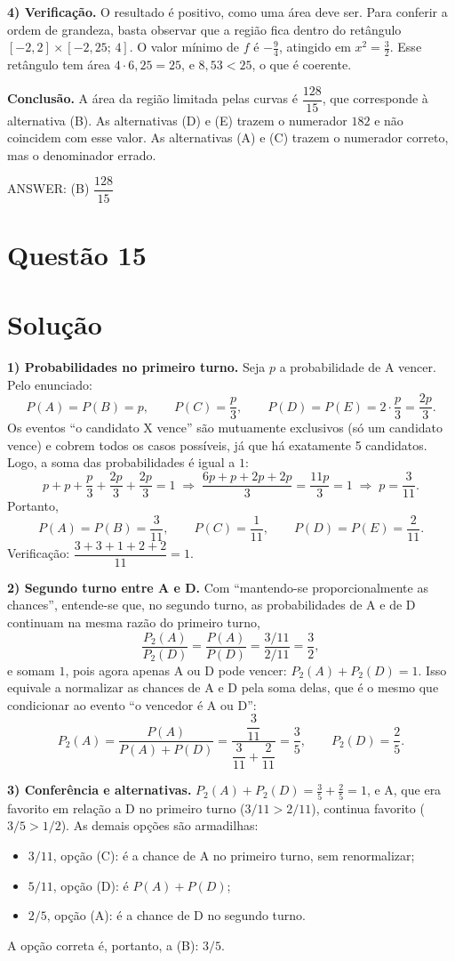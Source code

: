 \documentclass{article}%
\begin{document}
\textbf{4) Verificação.} O resultado é positivo, como uma área deve ser. Para conferir a ordem de grandeza, basta observar que a região fica dentro do retângulo $[-2,2]\times[-2{,}25;\,4]$. O valor mínimo de $f$ é $-\frac{9}{4}$, atingido em $x^2=\frac{3}{2}$. Esse retângulo tem área $4\cdot 6{,}25=25$, e $8{,}53<25$, o que é coerente.

\textbf{Conclusão.} A área da região limitada pelas curvas é $\dfrac{128}{15}$, que corresponde à alternativa (B). As alternativas (D) e (E) trazem o numerador $182$ e não coincidem com esse valor. As alternativas (A) e (C) trazem o numerador correto, mas o denominador errado.

ANSWER: (B) $\dfrac{128}{15}$%
\newpage%
\section*{Questão 15}

\section*{Solução}

\textbf{1) Probabilidades no primeiro turno.} Seja $p$ a probabilidade de A vencer. Pelo enunciado:
\[
P(A)=P(B)=p,\qquad P(C)=\frac{p}{3},\qquad P(D)=P(E)=2\cdot\frac{p}{3}=\frac{2p}{3}.
\]
Os eventos ``o candidato X vence'' são mutuamente exclusivos (só um candidato vence) e cobrem todos os casos possíveis, já que há exatamente 5 candidatos. Logo, a soma das probabilidades é igual a $1$:
\[
p+p+\frac{p}{3}+\frac{2p}{3}+\frac{2p}{3}=1
\;\Longrightarrow\;
\frac{6p+p+2p+2p}{3}=\frac{11p}{3}=1
\;\Longrightarrow\;
p=\frac{3}{11}.
\]
Portanto,
\[
P(A)=P(B)=\frac{3}{11},\qquad P(C)=\frac{1}{11},\qquad P(D)=P(E)=\frac{2}{11}.
\]
Verificação: $\dfrac{3+3+1+2+2}{11}=1$.

\textbf{2) Segundo turno entre A e D.} Com ``mantendo-se proporcionalmente as chances'', entende-se que, no segundo turno, as probabilidades de A e de D continuam na mesma razão do primeiro turno,
\[
\frac{P_2(A)}{P_2(D)}=\frac{P(A)}{P(D)}=\frac{3/11}{2/11}=\frac{3}{2},
\]
e somam $1$, pois agora apenas A ou D pode vencer: $P_2(A)+P_2(D)=1$. Isso equivale a normalizar as chances de A e D pela soma delas, que é o mesmo que condicionar ao evento ``o vencedor é A ou D'':
\[
P_2(A)=\frac{P(A)}{P(A)+P(D)}=\frac{\dfrac{3}{11}}{\dfrac{3}{11}+\dfrac{2}{11}}=\frac{3}{5},
\qquad
P_2(D)=\frac{2}{5}.
\]

\textbf{3) Conferência e alternativas.} $P_2(A)+P_2(D)=\frac{3}{5}+\frac{2}{5}=1$, e A, que era favorito em relação a D no primeiro turno ($3/11>2/11$), continua favorito ($3/5>1/2$). As demais opções são armadilhas:
\begin{itemize}
\item $3/11$, opção (C): é a chance de A no primeiro turno, sem renormalizar;
\item $5/11$, opção (D): é $P(A)+P(D)$;
\item $2/5$, opção (A): é a chance de D no segundo turno.
\end{itemize}
A opção correta é, portanto, a (B): $3/5$.
\end{document}

